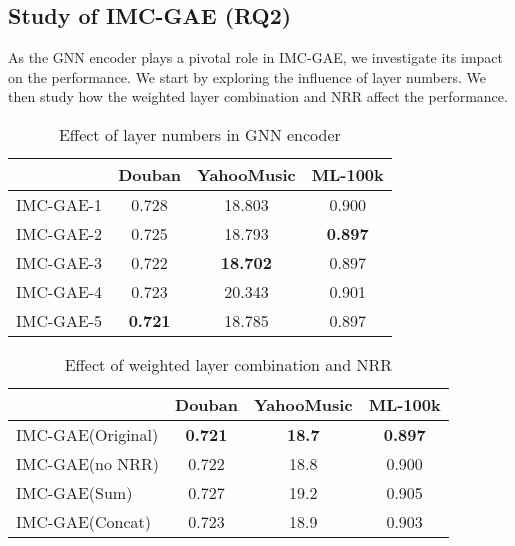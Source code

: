 \documentclass[sigconf]{acmart}
\begin{document}
\subsection{Study of IMC-GAE (RQ2)}
As the GNN encoder plays a pivotal role in IMC-GAE, we investigate its impact on the performance. We start by exploring the influence of layer numbers. We then study how the weighted layer combination and NRR affect the performance. 
\begin{table}
  \caption{Effect of layer numbers in GNN encoder}
  \label{tab:Layers}
  \begin{tabular}{lccc}
    \toprule
     &\textbf{Douban}&\textbf{YahooMusic} & \textbf{ML-100k}\\
    \midrule
    IMC-GAE-1 & 0.728 & 18.803 & 0.900 \\
    IMC-GAE-2 & 0.725 & 18.793 & \textbf{0.897} \\
    IMC-GAE-3 & 0.722 & \textbf{18.702} & 0.897 \\
    IMC-GAE-4 & 0.723 & 20.343 & 0.901 \\
    IMC-GAE-5 & \textbf{0.721} & 18.785 & 0.897 \\
  \bottomrule
\end{tabular}
\end{table}

\begin{table}
  \caption{Effect of weighted layer combination and NRR}
  \label{tab:Ablation}
  \begin{tabular}{lccc}
    \toprule
     &\textbf{Douban}&\textbf{YahooMusic}& \textbf{ML-100k}\\
    \midrule
    IMC-GAE(Original) & \textbf{0.721}& \textbf{18.7}&  \textbf{0.897}\\
    IMC-GAE(no NRR) & 0.722& 18.8&  0.900\\
    IMC-GAE(Sum) & 0.727 & 19.2&  0.905\\
    IMC-GAE(Concat) & 0.723& 18.9&  0.903\\
  \bottomrule
\end{tabular}
\end{table}
\end{document}
